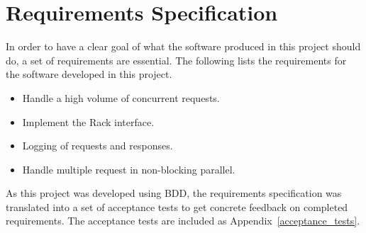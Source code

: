 \section{Requirements Specification}
In order to have a clear goal of what the software produced in this project
should do, a set of requirements are essential. The following lists the
requirements for the software developed in this project.

\begin{itemize}
  \item Handle a high volume of concurrent requests.
  \item Implement the Rack interface.
  \item Logging of requests and responses.
  \item Handle multiple request in non-blocking parallel.
\end{itemize}

As this project was developed using BDD, the requirements specification was
translated into a set of acceptance tests to get concrete feedback on
completed requirements. The acceptance tests are included as
Appendix~\ref{acceptance_tests}.

